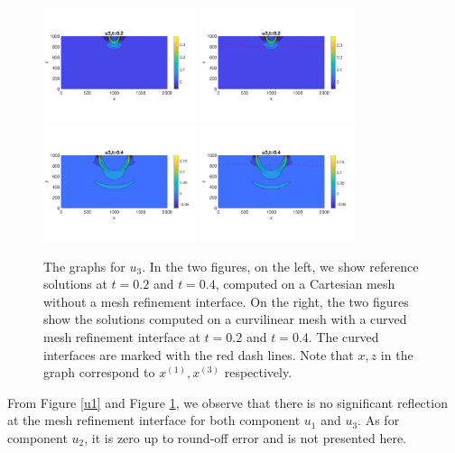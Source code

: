 \begin{figure}[htbp]
	\centering
	\includegraphics[width=0.4\textwidth,trim={0 2.8cm 0 2.8cm}, clip]{u3_t02_cartesian.png}
	\includegraphics[width=0.4\textwidth,trim={0 2.8cm 0 2.8cm}, clip]{u3_t02_curvi_mr.png}\\
	\includegraphics[width=0.4\textwidth,trim={0 2.8cm 0 2.8cm}, clip]{u3_t04_cartesian.png}
	\includegraphics[width=0.4\textwidth,trim={0 2.8cm 0 2.8cm}, clip]{u3_t04_curvi_mr.png}
	\caption{The graphs for $u_3$. In the two figures, on the left, we show reference solutions at $t=0.2$ and $t=0.4$, computed on a Cartesian mesh without a mesh refinement interface. On the right, the two figures show the solutions computed on a curvilinear mesh with a curved mesh refinement interface at $t=0.2$ and $t=0.4$. The curved interfaces are marked with the red dash lines. Note that $x,z$ in the graph correspond to $x^{(1)}, x^{(3)}$ respectively.}
\label{u3}
\end{figure}
From Figure \ref{u1} and Figure \ref{u3}, we observe that there is no significant reflection at the mesh refinement interface for both component $u_1$ and $u_3$. As for component $u_2$, it is zero up to round-off error and is not presented here.